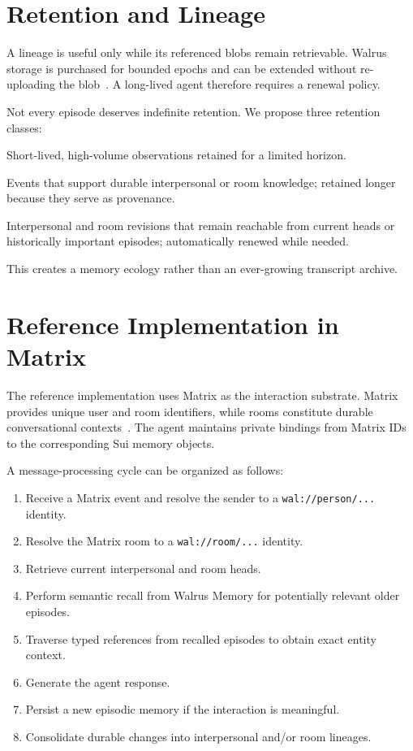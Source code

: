 \documentclass[11pt]{article}
\begin{document}
\section{Retention and Lineage}

A lineage is useful only while its referenced blobs remain retrievable. Walrus storage is purchased for bounded epochs and can be extended without re-uploading the blob~\cite{walrus-whitepaper}. A long-lived agent therefore requires a renewal policy.

Not every episode deserves indefinite retention. We propose three retention classes:

\begin{description}[style=nextline]
\item[Working episodes]
Short-lived, high-volume observations retained for a limited horizon.

\item[Consolidated episodes]
Events that support durable interpersonal or room knowledge; retained longer because they serve as provenance.

\item[Identity lineage]
Interpersonal and room revisions that remain reachable from current heads or historically important episodes; automatically renewed while needed.
\end{description}

This creates a memory ecology rather than an ever-growing transcript archive.

\section{Reference Implementation in Matrix}

The reference implementation uses Matrix as the interaction substrate. Matrix provides unique user and room identifiers, while rooms constitute durable conversational contexts~\cite{matrix-spec}. The agent maintains private bindings from Matrix IDs to the corresponding Sui memory objects.

A message-processing cycle can be organized as follows:

\begin{enumerate}
    \item Receive a Matrix event and resolve the sender to a \texttt{wal://person/...} identity.
    \item Resolve the Matrix room to a \texttt{wal://room/...} identity.
    \item Retrieve current interpersonal and room heads.
    \item Perform semantic recall from Walrus Memory for potentially relevant older episodes.
    \item Traverse typed references from recalled episodes to obtain exact entity context.
    \item Generate the agent response.
    \item Persist a new episodic memory if the interaction is meaningful.
    \item Consolidate durable changes into interpersonal and/or room lineages.
\end{enumerate}
\end{document}
